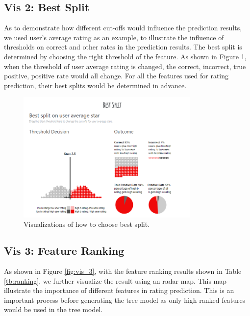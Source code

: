 \documentclass{vgtc}                          %
\begin{document}
\subsection{Vis 2: Best Split}

As to demonstrate how different cut-offs would influence the prediction results, we used user's average rating as an example, to illustrate the influence of thresholds on correct and other rates in the prediction results. The best split is determined by choosing the right threshold of the feature. As shown in Figure \ref{fig:vis_2}, when the threshold of user average rating is changed, the correct, incorrect, true positive, positive rate would all change. For all the features used for rating prediction, their best splits would be determined in advance. 


\begin{figure}[h]
  \centering
  \includegraphics[width=9cm]{vis_2.png}
  \caption{Visualizations of how to choose best split.}
  \label{fig:vis_2}
\end{figure}

\subsection{Vis 3: Feature Ranking}

As shown in Figure \ref{fig:vis_3}, with the feature ranking results shown in Table \ref{tb:ranking}, we further visualize the result using an radar map. This map illustrate the importance of different features in rating prediction. This is an important process before generating the tree model as only high ranked features would be used in the tree model. 
\end{document}
